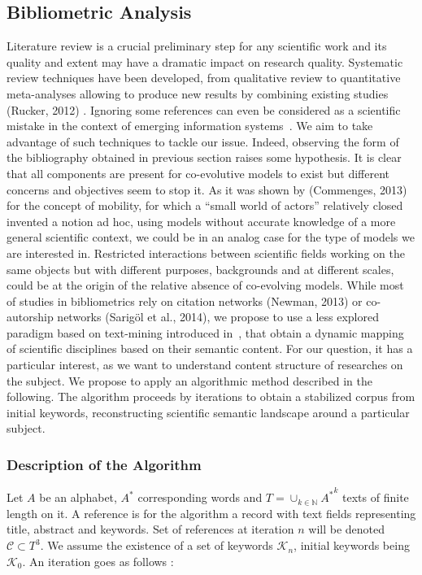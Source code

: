 \subsection{Bibliometric Analysis}

Literature review is a crucial preliminary step for any scientific work and its quality and extent may have a dramatic impact on research quality. Systematic review techniques have been developed, from qualitative review to quantitative meta-analyses allowing to produce new results by combining existing studies (Rucker, 2012) . Ignoring some references can even be considered as a scientific mistake in the context of emerging information systems~\cite{lissacksubliminal}. We aim to take advantage of such techniques to tackle our issue.
Indeed, observing the form of the bibliography obtained in previous section raises some hypothesis. It is clear that all components are present for co-evolutive models to exist but different concerns and objectives seem to stop it. As it was shown by (Commenges, 2013) for the concept of mobility, for which a “small world of actors” relatively closed invented a notion ad hoc, using models without accurate knowledge of a more general scientific context, we could be in an analog case for the type of models we are interested in. Restricted interactions between scientific fields working on the same objects but with different purposes, backgrounds and at different scales, could be at the origin of the relative absence of co-evolving models. 
While most of studies in bibliometrics rely on citation networks (Newman, 2013)  or co-autorship networks (Sarigöl et al., 2014), we propose to use a less explored paradigm based on text-mining introduced in~\cite{chavalarias2013phylomemetic}, that obtain a dynamic mapping of scientific disciplines based on their semantic content. For our question, it has a particular interest, as we want to understand content structure of researches on the subject. We propose to apply an algorithmic method described in the following. The algorithm proceeds by iterations to obtain a stabilized corpus from initial keywords, reconstructing scientific semantic landscape around a particular subject.

\subsubsection{Description of the Algorithm}

Let $A$ be an alphabet, $A^{\ast}$ corresponding words and $T = \cup_{k\in \mathbb{N}} {A^{\ast}}^k$ texts of finite length on it. A reference is for the algorithm a record with text fields representing title, abstract and keywords. Set of references at iteration $n$ will be denoted $\mathcal{C} \subset T^3$. We assume the existence of a set of keywords $\mathcal{K}_n$, initial keywords being $\mathcal{K}_0$. An iteration goes as follows :

